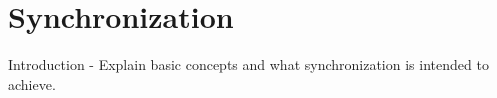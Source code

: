 \chapter{Synchronization} \label{ch:synchronization}

Introduction - Explain basic concepts and what synchronization is intended to achieve.




